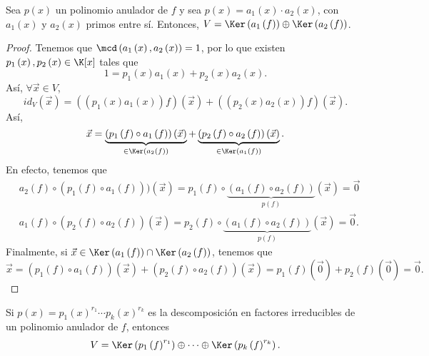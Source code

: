 \begin{ftheorem}[]
\normalfont Sea $\displaystyle p\left(x\right) $ un polinomio anulador de $\displaystyle f $ y sea $\displaystyle p\left(x\right) = a_{1}\left(x\right) \cdot a_{2}\left(x\right) $, con $\displaystyle a_{1}\left(x\right) $ y $\displaystyle a_{2}\left(x\right) $ primos entre sí. Entonces, $\displaystyle V = \Ker\left(a_{1}\left(f\right)\right) \oplus \Ker\left(a_{2}\left(f\right)\right) $.
\end{ftheorem}
\begin{proof}
	Tenemos que $\displaystyle \mcd\left(a_{1}\left(x\right), a_{2}\left(x\right)\right) = 1 $, por lo que existen $\displaystyle p_{1}\left(x\right), p_{2}\left(x\right) \in \K[x] $ tales que 
	\[ 1 = p_{1}\left(x\right)a_{1}\left(x\right) + p_{2}\left(x\right)a_{2}\left(x\right) .\]
Así, $\displaystyle \forall \vec{x} \in V $, 
\[id _{V}\left(\vec{x}\right) = \left(\left(p_{1}\left(x\right)a_{1}\left(x\right)\right)f\right)\left(\vec{x}\right) + \left(\left(p_{2}\left(x\right)a_{2}\left(x\right)\right)f\right)\left(\vec{x}\right) .\]
Así,
\[\vec{x} = \underbrace{\left(p_{1}\left(f\right)\circ a_{1}\left(f\right)\right)\left(\vec{x}\right)}_{\in\Ker\left(a_{2}\left(f\right)\right)}+\underbrace{\left(p_{2}\left(f\right)\circ a_{2}\left(f\right)\right)\left(\vec{x}\right)}_{\in\Ker\left(a_{1}\left(f\right)\right)} .\]
En efecto, tenemos que 
\[
\begin{split}
	& a_{2}\left(f\right) \circ \left(p_{1}\left(f\right)\circ a_{1}\left(f\right)\right))\left(\vec{x}\right) = p_{1}\left(f\right)\circ\underbrace{\left(a_{1}\left(f\right)\circ a_{2}\left(f\right)\right)}_{p\left(f\right)}\left(\vec{x}\right) = \vec{0} \\
	& a_{1}\left(f\right) \circ \left(p_{2}\left(f\right)\circ a_{2}\left(f\right)\right)\left(\vec{x}\right) = p_{2}\left(f\right) \circ \underbrace{\left(a_{1}\left(f\right)\circ a_{2}\left(f\right)\right)}_{p\left(f\right)}\left(\vec{x}\right) = \vec{0}.
\end{split}
\]
Finalmente, si $\displaystyle \vec{x}\in \Ker\left(a_{1}\left(f\right)\right)\cap\Ker\left(a_{2}\left(f\right)\right) $, tenemos que 
\[\vec{x} = \left(p_{1}\left(f\right) \circ a_{1}\left(f\right)\right)\left(\vec{x}\right) + \left(p_{2}\left(f\right)\circ a_{2}\left(f\right)\right)\left(\vec{x}\right) = p_{1}\left(f\right)\left(\vec{0}\right) + p_{2}\left(f\right)\left(\vec{0}\right) = \vec{0} .\]
\end{proof}
\begin{fprop}[]
\normalfont Si $\displaystyle p\left(x\right) = p_{1}\left(x\right)^{r_{1}}\cdots p_{k}\left(x\right)^{r_{k}} $ es la descomposición en factores irreducibles de un polinomio anulador de $\displaystyle f $, entonces
\[V = \Ker\left(p_{1}\left(f\right)^{r_{1}}\right) \oplus \cdots \oplus \Ker\left(p_{k}\left(f\right)^{r_{k}}\right) .\]
\end{fprop}
